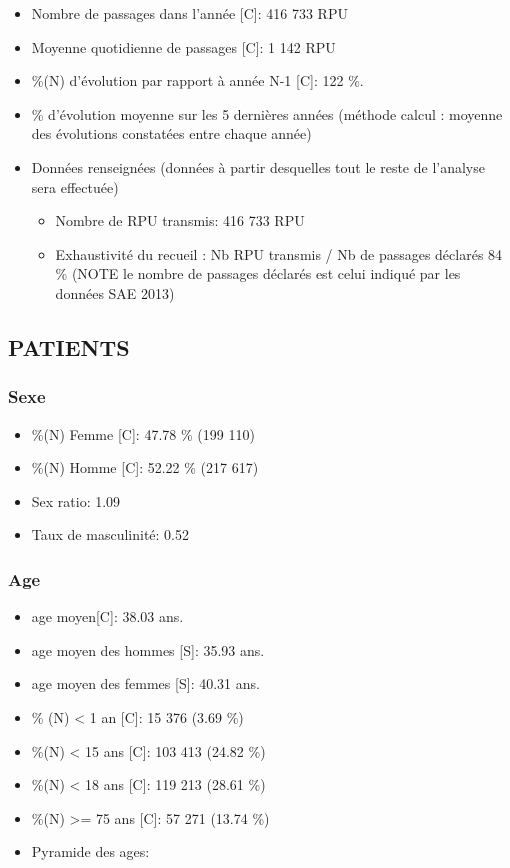 \documentclass[]{article}
\begin{document}
\begin{itemize}
\itemsep1pt\parskip0pt
\item
  Nombre de passages dans l'année {[}C{]}: 416 733 RPU
\item
  Moyenne quotidienne de passages {[}C{]}: 1 142 RPU
\item
  \%(N) d'évolution par rapport à année N-1 {[}C{]}: 122 \%.
\item
  \% d'évolution moyenne sur les 5 dernières années (méthode calcul :
  moyenne des évolutions constatées entre chaque année)
\item
  Données renseignées (données à partir desquelles tout le reste de
  l'analyse sera effectuée)

  \begin{itemize}
  \itemsep1pt\parskip0pt
  \item
    Nombre de RPU transmis: 416 733 RPU
  \item
    Exhaustivité du recueil : Nb RPU transmis / Nb de passages déclarés
    84 \% (NOTE le nombre de passages déclarés est celui indiqué par les
    données SAE 2013)
  \end{itemize}
\end{itemize}

\subsection{PATIENTS}\label{patients}

\subsubsection{Sexe}\label{sexe}

\begin{itemize}
\itemsep1pt\parskip0pt
\item
  \%(N) Femme {[}C{]}: 47.78 \% (199 110)
\item
  \%(N) Homme {[}C{]}: 52.22 \% (217 617)
\item
  Sex ratio: 1.09
\item
  Taux de masculinité: 0.52
\end{itemize}

\subsubsection{Age}\label{age}

\begin{itemize}
\item
  age moyen{[}C{]}: 38.03 ans.
\item
  age moyen des hommes {[}S{]}: 35.93 ans.
\item
  age moyen des femmes {[}S{]}: 40.31 ans.
\item
  \% (N) \textless{} 1 an {[}C{]}: 15 376 (3.69 \%)
\item
  \%(N) \textless{} 15 ans {[}C{]}: 103 413 (24.82 \%)
\item
  \%(N) \textless{} 18 ans {[}C{]}: 119 213 (28.61 \%)
\item
  \%(N) \textgreater{}= 75 ans {[}C{]}: 57 271 (13.74 \%)
\item
  Pyramide des ages:
\end{itemize}
\end{document}
